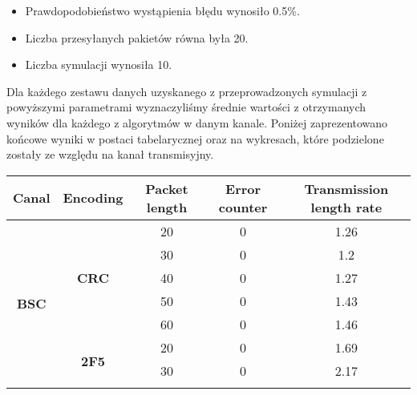 \documentclass{article}
\begin{document}
\begin{itemize}
    \item Prawdopodobieństwo wystąpienia błędu wynosiło 0.5\%.
    \item Liczba przesyłanych pakietów równa była 20.
    \item Liczba symulacji wynosiła 10.
\end{itemize}

\noindent
Dla każdego zestawu danych uzyskanego z przeprowadzonych symulacji z powyższymi parametrami wyznaczyliśmy średnie wartości z otrzymanych wyników dla każdego z algorytmów w danym kanale. Poniżej zaprezentowano końcowe wyniki w postaci tabelarycznej oraz na wykresach, które podzielone zostały ze względu na kanał transmisyjny.

\newpage

\begin{table}[h!]
\begin{tabular}{|c|c|c|c|c|}
\hline
\textbf{Canal}                 & \textbf{Encoding}             & \textbf{Packet length} & \textbf{Error counter} & \textbf{Transmission length rate} \\ \hline
\multirow{15}{*}{\textbf{BSC}} & \multirow{5}{*}{\textbf{CRC}} & 20                     & 0                      & 1.26                              \\ \cline{3-5} 
                               &                               & 30                     & 0                      & 1.2                               \\ \cline{3-5} 
                               &                               & 40                     & 0                      & 1.27                              \\ \cline{3-5} 
                               &                               & 50                     & 0                      & 1.43                              \\ \cline{3-5} 
                               &                               & 60                     & 0                      & 1.46                              \\ \cline{2-5} 
                               & \multirow{5}{*}{\textbf{2F5}} & 20                     & 0                      & 1.69                              \\ \cline{3-5} 
                               &                               & 30                     & 0                      & 2.17                              \\ \cline{3-5} 

\end{tabular}
\end{table}
\end{document}
